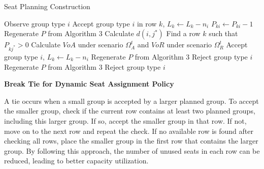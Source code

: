 



\begin{algorithm}[h]
  \caption{Seat Planning Construction}\label{algo_dynamic_policy}
  { Observe group type $i$\;
    {Accept group type $i$ in row $k$, $L_{k} \gets L_{k} -n_{i}$\; $P_{ki} \gets P_{ki} -1$\;
    {Regenerate $P$ from Algorithm 3}
    }
    {Calculate $d(i, j^{*})$\;
    {Find a row $k$ such that $P_{kj^{*}} > 0$\; 
    Calculate $VoA$ under scenario $\Omega^{t}_{A}$ and $VoR$ under scenario $\Omega^{t}_{R}$\;
    {Accept group type $i$, $L_{k} \gets L_{k} - n_{i}$\; Regenerate $P$ from Algorithm 3\;}
    {Reject group type $i$\; Regenerate $P$ from Algorithm 3\;}}
    {Reject group type $i$}
    }}
\end{algorithm}

{\bf{Break Tie for Dynamic Seat Assignment Policy}}

A tie occurs when a small group is accepted by a larger planned group. To accept the smaller group, check if the current row contains at least two planned groups, including this larger group. If so, accept the smaller group in that row. If not, move on to the next row and repeat the check. If no available row is found after checking all rows, place the smaller group in the first row that contains the larger group. By following this approach, the number of unused seats in each row can be reduced, leading to better capacity utilization.



